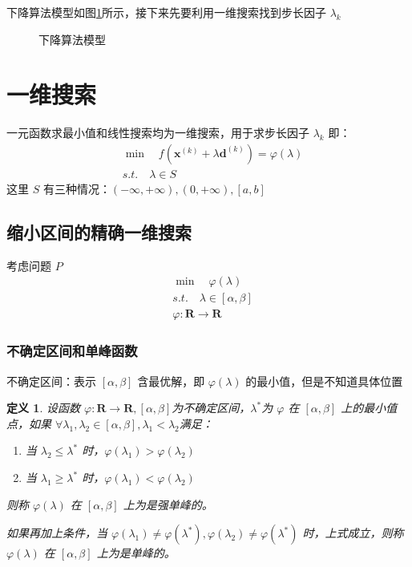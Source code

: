 \documentclass{book}
\newtheorem{definition}{\indent 定义}[chapter]
\begin{document}
下降算法模型如图\ref{fig:DescentOptimizationFlow}所示，接下来先要利用一维搜索找到步长因子 $\lambda_k$

\begin{figure}[ht]
    \centering
    
    \caption{下降算法模型}
    \label{fig:DescentOptimizationFlow}
\end{figure}

\section{一维搜索}

一元函数求最小值和线性搜索均为一维搜索，用于求步长因子 $\lambda_k$ 即：
\begin{align*}
     & \min\quad f(\boldsymbol{x}^{(k)}+\lambda\boldsymbol{d}^{(k)})=\varphi (\lambda) \\
     & s.t.\quad \lambda\in S
\end{align*}
这里 $S$ 有三种情况：$(-\infty,+\infty),(0,+\infty),[a,b]$

\subsection{缩小区间的精确一维搜索}

考虑问题 $P$
\begin{align*}
     & \min\quad \varphi(\lambda)                 \\
     & s.t.\quad \lambda\in[\alpha,\beta]         \\
     & \varphi: \mathbf{R} \rightarrow \mathbf{R}
\end{align*}

\subsubsection{不确定区间和单峰函数}

不确定区间：表示 $[\alpha,\beta]$ 含最优解，即 $\varphi(\lambda)$ 的最小值，但是不知道具体位置

\begin{definition}
    设函数 $\varphi:\mathbf{R}\rightarrow\mathbf{R}, [\alpha,\beta]$为不确定区间，$\lambda^*$为 $\varphi$ 在 $[\alpha,\beta]$ 上的最小值点，如果 $\forall\lambda_1,\lambda_2\in[\alpha,\beta], \lambda_1<\lambda_2$满足：
    \begin{enumerate}
        \item 当 $\lambda_2\le\lambda^*$ 时，$\varphi(\lambda_1)>\varphi(\lambda_2)$
        \item 当 $\lambda_1\ge\lambda^*$ 时，$\varphi(\lambda_1)<\varphi(\lambda_2)$
    \end{enumerate}
    则称 $\varphi(\lambda)$ 在 $[\alpha,\beta]$ 上为是强单峰的。

    如果再加上条件，当 $\varphi(\lambda_1)\ne\varphi(\lambda^*), \varphi(\lambda_2)\ne\varphi(\lambda^*)$ 时，上式成立，则称 $\varphi(\lambda)$ 在 $[\alpha,\beta]$ 上为是单峰的。
\end{definition}
\end{document}
